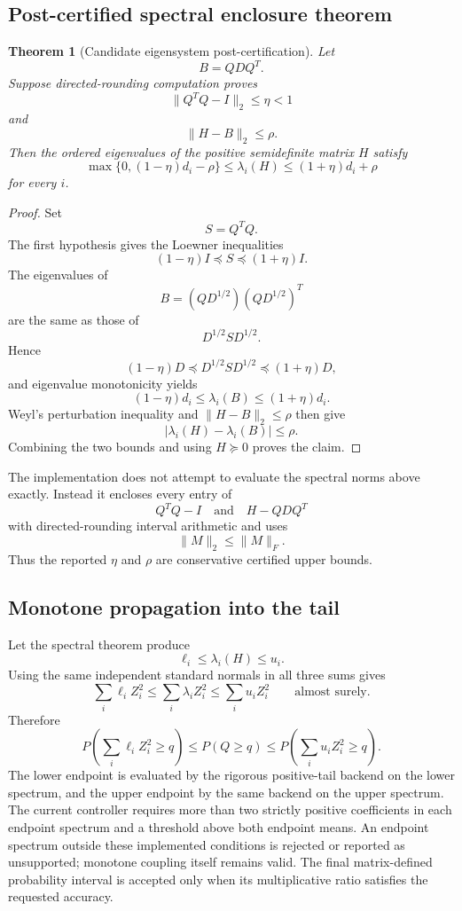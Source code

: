 \documentclass[11pt]{article}
\newtheorem{theorem}{Theorem}[section]
\theoremstyle{definition}
\theoremstyle{remark}
\begin{document}
\subsection{Post-certified spectral enclosure theorem}

\begin{theorem}[Candidate eigensystem post-certification]\label{claim:final-6-1}
Let
\[
B=QDQ^T.
\]
Suppose directed-rounding computation proves
\[
\|Q^TQ-I\|_2\le\eta<1
\]
and
\[
\|H-B\|_2\le\rho.
\]
Then the ordered eigenvalues of the positive semidefinite matrix \(H\) satisfy
\[
\boxed{
\max\{0,(1-\eta)d_i-\rho\}
\le
\lambda_i(H)
\le
(1+\eta)d_i+\rho
}
\]
for every \(i\).
\end{theorem}

\begin{proof}
Set
\[
S=Q^TQ.
\]
The first hypothesis gives the Loewner inequalities
\[
(1-\eta)I\preceq S\preceq(1+\eta)I.
\]
The eigenvalues of
\[
B=(QD^{1/2})(QD^{1/2})^T
\]
are the same as those of
\[
D^{1/2}SD^{1/2}.
\]
Hence
\[
(1-\eta)D
\preceq
D^{1/2}SD^{1/2}
\preceq
(1+\eta)D,
\]
and eigenvalue monotonicity yields
\[
(1-\eta)d_i
\le
\lambda_i(B)
\le
(1+\eta)d_i.
\]
Weyl's perturbation inequality and
\(\|H-B\|_2\le\rho\) then give
\[
|\lambda_i(H)-\lambda_i(B)|\le\rho.
\]
Combining the two bounds and using \(H\succeq0\) proves the claim.
\end{proof}

The implementation does not attempt to evaluate the spectral norms above
exactly.  Instead it encloses every entry of
\[
Q^TQ-I
\quad\text{and}\quad
H-QDQ^T
\]
with directed-rounding interval arithmetic and uses
\[
\|M\|_2\le\|M\|_F.
\]
Thus the reported \(\eta\) and \(\rho\) are conservative certified upper
bounds.

\subsection{Monotone propagation into the tail}

Let the spectral theorem produce
\[
\ell_i\le\lambda_i(H)\le u_i.
\]
Using the same independent standard normals in all three sums gives
\[
\sum_i\ell_iZ_i^2
\le
\sum_i\lambda_iZ_i^2
\le
\sum_i u_iZ_i^2
\qquad\text{almost surely}.
\]
Therefore
\[
\boxed{
P\!\left(\sum_i\ell_iZ_i^2\ge q\right)
\le
P(Q\ge q)
\le
P\!\left(\sum_i u_iZ_i^2\ge q\right).
}
\]
The lower endpoint is evaluated by the rigorous positive-tail backend on the
lower spectrum, and the upper endpoint by the same backend on the upper
spectrum.  The current controller requires more than two strictly positive
coefficients in each endpoint spectrum and a threshold above both endpoint
means.  An endpoint spectrum outside these implemented conditions is rejected
or reported as unsupported; monotone coupling itself remains valid.  The final matrix-defined probability interval is accepted only when
its multiplicative ratio satisfies the requested accuracy.
\end{document}
